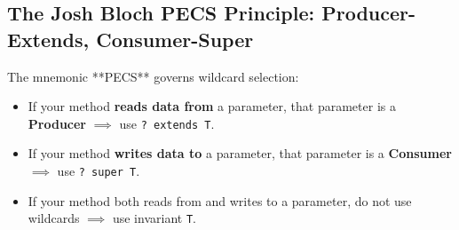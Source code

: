 \documentclass[10pt,journal,compsoc,onecolumn]{IEEEtran}
\begin{document}
\begin{table}[t]
\centering
\small
\caption{Variance Matrix and Method Capabilities for Parameterized Collections}
\label{tab:wildcard_matrix}
\end{table}

\subsection{The Josh Bloch PECS Principle: Producer-Extends, Consumer-Super}
The mnemonic **PECS** governs wildcard selection:
\begin{itemize}
    \item If your method \textbf{reads data from} a parameter, that parameter is a \textbf{Producer} $\implies$ use \texttt{? extends T}.
    \item If your method \textbf{writes data to} a parameter, that parameter is a \textbf{Consumer} $\implies$ use \texttt{? super T}.
    \item If your method both reads from and writes to a parameter, do not use wildcards $\implies$ use invariant \texttt{T}.
\end{itemize}
\end{document}
